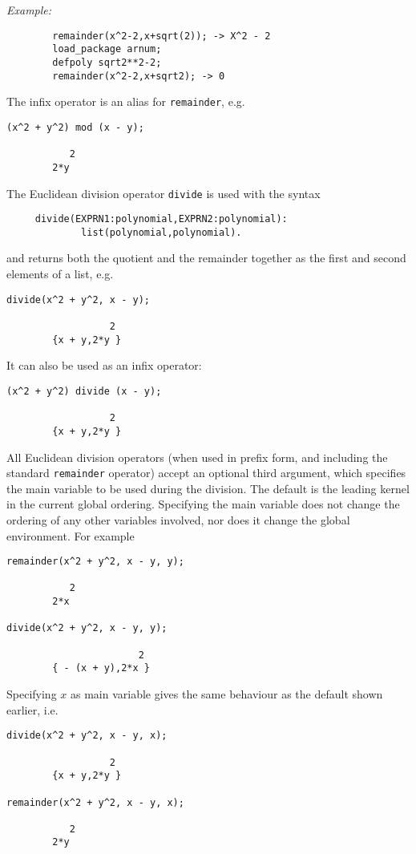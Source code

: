 \textit{Example:}
\begin{verbatim}
        remainder(x^2-2,x+sqrt(2)); -> X^2 - 2
        load_package arnum;
        defpoly sqrt2**2-2;
        remainder(x^2-2,x+sqrt2); -> 0
\end{verbatim}
The infix operator  is an alias for \texttt{remainder}, e.g.
\begin{verbatim}
(x^2 + y^2) mod (x - y);

           2
        2*y
\end{verbatim}
The Euclidean division operator \texttt{divide} is used with the syntax
\begin{verbatim}
     divide(EXPRN1:polynomial,EXPRN2:polynomial):
             list(polynomial,polynomial).
\end{verbatim}
and returns
both the quotient and the remainder together as the first and second
elements of a list, e.g.
\begin{verbatim}
divide(x^2 + y^2, x - y);

                  2
        {x + y,2*y }
\end{verbatim}
It can also be used as an infix operator:
\begin{verbatim}
(x^2 + y^2) divide (x - y);

                  2
        {x + y,2*y }
\end{verbatim}
All Euclidean division operators (when used in prefix form, and
including the standard \texttt{remainder} operator) accept an optional
third argument, which specifies the main variable to be used during
the division.  The default is the leading kernel in the current global
ordering.  Specifying the main variable does not change the ordering
of any other variables involved, nor does it change the global
environment.  For example
\begin{verbatim}
remainder(x^2 + y^2, x - y, y);

           2
        2*x

divide(x^2 + y^2, x - y, y);

                       2
        { - (x + y),2*x }
\end{verbatim}

Specifying $x$ as main variable gives the same behaviour as the
default shown earlier, i.e.
\begin{verbatim}
divide(x^2 + y^2, x - y, x);

                  2
        {x + y,2*y }

remainder(x^2 + y^2, x - y, x);

           2
        2*y
\end{verbatim}




